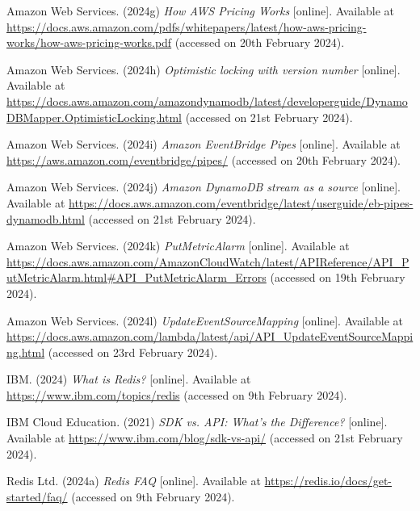 \noindent Amazon Web Services. (2024g) \textit{How AWS Pricing Works} [online]. Available at \url{https://docs.aws.amazon.com/pdfs/whitepapers/latest/how-aws-pricing-works/how-aws-pricing-works.pdf} (accessed on 20th February 2024).
\vspace{0.2cm}

\noindent Amazon Web Services. (2024h) \textit{Optimistic locking with version number} [online]. Available at \url{https://docs.aws.amazon.com/amazondynamodb/latest/developerguide/DynamoDBMapper.OptimisticLocking.html} (accessed on 21st February 2024).
\vspace{0.2cm}

\noindent Amazon Web Services. (2024i) \textit{Amazon EventBridge Pipes} [online]. Available at \url{https://aws.amazon.com/eventbridge/pipes/} (accessed on 20th February 2024).
\vspace{0.2cm}

\noindent Amazon Web Services. (2024j) \textit{Amazon DynamoDB stream as a source} [online]. Available at \url{https://docs.aws.amazon.com/eventbridge/latest/userguide/eb-pipes-dynamodb.html} (accessed on 21st February 2024).
\vspace{0.2cm}

\noindent Amazon Web Services. (2024k) \textit{PutMetricAlarm} [online]. Available at \url{https://docs.aws.amazon.com/AmazonCloudWatch/latest/APIReference/API_PutMetricAlarm.html#API_PutMetricAlarm_Errors} (accessed on 19th February 2024).
\vspace{0.2cm}

\noindent Amazon Web Services. (2024l) \textit{UpdateEventSourceMapping} [online]. Available at \url{https://docs.aws.amazon.com/lambda/latest/api/API_UpdateEventSourceMapping.html} (accessed on 23rd February 2024).
\vspace{0.2cm}

\noindent IBM. (2024) \textit{What is Redis?} [online]. Available at \url{https://www.ibm.com/topics/redis} (accessed on 9th February 2024).
\vspace{0.2cm}

\noindent IBM Cloud Education. (2021) \textit{SDK vs. API: What's the Difference?} [online]. Available at \url{https://www.ibm.com/blog/sdk-vs-api/} (accessed on 21st February 2024).
\vspace{0.2cm}

\noindent Redis Ltd. (2024a) \textit{Redis FAQ} [online]. Available at \url{https://redis.io/docs/get-started/faq/} (accessed on 9th February 2024).
\vspace{0.2cm}


